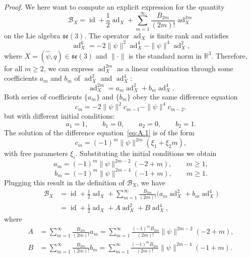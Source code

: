 \documentclass[11pt]{article}
\newcommand{\se}{\mathfrak{se}}
\newcommand{\ad}{\operatorname{ad}}
\newcommand{\id}{\operatorname{id}}
\newcommand{\R}{\mathbb R}
\newcommand{\calB}{\mathcal B}
\begin{document}
\noindent\textit{Proof.} We here want to compute an explicit expression for the quantity
\begin{equation*}
\calB_X=\id+\frac12\ad_X+\sum_{m=1}^{\infty}\frac{B_{2m}}{(2m)!}\ad_X^{2m}
\end{equation*}
on the Lie algebra $\se(3)$. The operator $\ad_X$ is finite rank and satisfies
\begin{equation*}
\ad_X^6=-2\|\psi\|^2\ad_X^4-\|\psi\|^4\ad_X^2,
\end{equation*}
where $X=(\widehat\psi,q)\in\se(3)$ and $\|\cdot\|$ is the standard norm in $\R^3$. Therefore, for all $m\geq2$, we can express $\ad_X^{2m}$ as a linear combination through some coefficients $a_m$ and $b_m$ of $\ad_X^2$ and $\ad_X^4$:
\begin{equation*}
\ad_X^{2m}=a_m\ad_X^2+b_m\ad_X^4.
\end{equation*}
Both series of coefficients $\{a_m\}$ and $\{b_m\}$ obey the same difference equation
\begin{equation*}
c_m=-2\|\psi\|^2c_{m-1}-\|\psi\|^4c_{m-2},\tag{A.1}\label{eq:A.1}
\end{equation*}
but with different initial conditions:
\begin{equation*}
a_1=1,\qquad b_1=0,\qquad a_2=0,\qquad b_2=1.
\end{equation*}
The solution of the difference equation~\eqref{eq:A.1} is of the form
\begin{equation*}
c_m=(-1)^m\|\psi\|^{2m}(\xi_1+\xi_2m),
\end{equation*}
with free parameters $\xi_i$. Substituting the initial conditions we obtain
\begin{equation*}
a_m=(-1)^m\|\psi\|^{2m-2}(-2+m),\qquad m\geq1,
\end{equation*}
\begin{equation*}
b_m=(-1)^m\|\psi\|^{2m-4}(-1+m),\qquad m\geq1.
\end{equation*}
Plugging this result in the definition of $\calB_X$, we have
\begin{align*}
\calB_X
&=\id+\frac12\ad_X+\sum_{m=1}^{\infty}\frac{B_{2m}}{(2m)!}\bigl(a_m\ad_X^2+b_m\ad_X^4\bigr)\\
&=\id+\frac12\ad_X+A\ad_X^2+B\ad_X^4,\tag{A.2}\label{eq:A.2}
\end{align*}
where
\begin{align*}
A&=\sum_{m=1}^{\infty}\frac{B_{2m}}{(2m)!}a_m
=\sum_{m=1}^{\infty}\frac{(-1)^mB_{2m}}{(2m)!}\|\psi\|^{2m-2}(-2+m),\\
B&=\sum_{m=1}^{\infty}\frac{B_{2m}}{(2m)!}b_m
=\sum_{m=1}^{\infty}\frac{(-1)^mB_{2m}}{(2m)!}\|\psi\|^{2m-4}(-1+m).
\end{align*}
\end{document}
